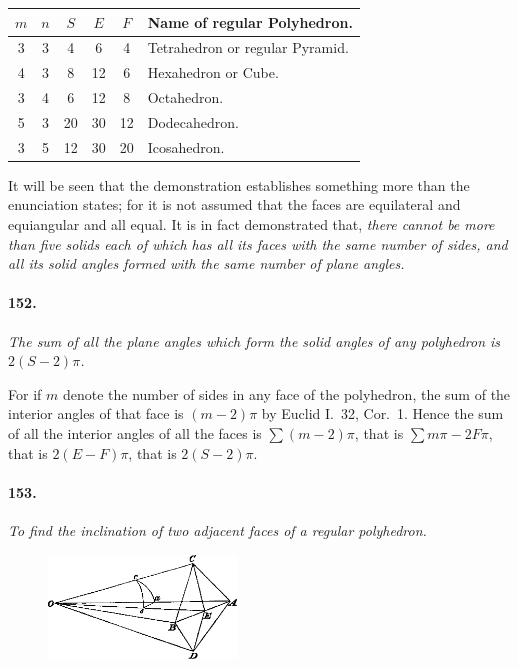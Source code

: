 \documentclass{book}[2004/02/16]
\begin{document}
\begin{mainmatter}
\begin{spacing}{1.3}
\begin{center}
\begin{tabular}{|c|c|c|c|c|l|}
\hline
$m$&$n$&$S$&$E$&$F$&\multicolumn{1}{c|}{Name of regular Polyhedron.}\\[1ex]
\hline
3&3&4&6&4&Tetrahedron or regular Pyramid.\\[1ex]
4&3&8&12&6&Hexahedron or Cube.\\[1ex]
3&4&6&12&8&Octahedron.\\[1ex]
5&3&20&30&12&Dodecahedron.\\[1ex]
3&5&12&30&20&Icosahedron.\\[1ex]
\hline
\end{tabular}
\end{center}

It will be seen that the demonstration establishes something
more than the enunciation states; for it is not assumed that the
faces are equilateral and equiangular and all equal. It is in fact
demonstrated that, \textit{there cannot be more than five solids each of
which has all its faces with the same number of sides, and all its
solid angles formed with the same number of plane angles.}

\paragraph{152.} \textit{The sum of all the plane angles which form the solid
angles of any polyhedron is $2(S-2)\pi$.}

For if $m$ denote the number of sides in any face of the polyhedron,
the sum of the interior angles of that face is $(m-2)\pi$
by Euclid I.~32, Cor.~1. Hence the sum of all the interior angles
of all the faces is $\sum(m-2)\pi$, that is $\sum m\pi-2F\pi$, that is
$2(E-F)\pi$, that is $2(S-2)\pi$.

\paragraph{153.} \textit{To find the inclination of two adjacent faces of a regular
polyhedron.}
\begin{figure}[htp]
\centering
\includegraphics[width=5.0cm]{images/126fc}
\end{figure}


\end{spacing}
\end{mainmatter}
\end{document}
